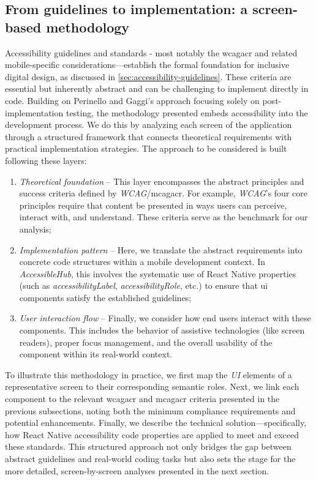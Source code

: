 \pagebreak

\subsection{From guidelines to implementation: a screen-based methodology}
\label{sec:accessiblehub-screen-methodology}

Accessibility guidelines and standards - most notably the \acrshort{wcagacr}  and related mobile-specific considerations—establish the formal foundation for inclusive digital design, as discussed in \ref{sec:accessibility-guidelines}. These criteria are essential but inherently abstract and can be challenging to implement directly in code. Building on Perinello and Gaggi's approach focusing solely on post-implementation testing, the methodology presented embeds accessibility into the development process. We do this by analyzing each screen of the application through a structured framework that connects theoretical requirements with practical implementation strategies. The approach to be considered is built following these layers:

\begin{enumerate}
    \item \textit{Theoretical foundation} – This layer encompasses the abstract principles and success criteria defined by \textit{WCAG}/\acrshort{mcagacr}. For example, \textit{WCAG}’s four core principles require that content be presented in ways users can perceive, interact with, and understand. These criteria serve as the benchmark for our analysis;

    \item \textit{Implementation pattern} – Here, we translate the abstract requirements into concrete code structures within a mobile development context. In \textit{AccessibleHub}, this involves the systematic use of React Native properties (such as \textit{accessibilityLabel}, \textit{accessibilityRole}, etc.) to ensure that \acrshort{ui} components satisfy the established guidelines;

    \item \textit{User interaction flow} – Finally, we consider how end users interact with these components. This includes the behavior of assistive technologies (like screen readers), proper focus management, and the overall usability of the component within its real-world context.
\end{enumerate}

To illustrate this methodology in practice, we first map the \textit{UI} elements of a representative screen to their corresponding semantic roles. Next, we link each component to the relevant \acrshort{wcagacr} and \acrshort{mcagacr} criteria presented in the previous subsections, noting both the minimum compliance requirements and potential enhancements. Finally, we describe the technical solution—specifically, how React Native accessibility code properties are applied to meet and exceed these standards. This structured approach not only bridges the gap between abstract guidelines and real-world coding tasks but also sets the stage for the more detailed, screen-by-screen analyses presented in the next section.

